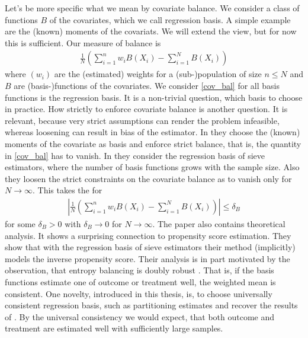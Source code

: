 Let's be more specific what we mean by covariate balance.
We consider a class of functions $B$ of the covariates, which we call regression basis.
A simple example are the (known) moments of the covariats.
We will extend the view, but for now this is sufficient.
Our measure of balance is
\begin{gather}
  \label{cov_bal}
  \frac{1}{N}
  \left( 
    \sum_{i=1}^{n}
    w_i
    B(X_i)
    -
    \sum_{i=1}^{N} 
    B(X_i)
  \right)
\end{gather}
where $(w_i)$ are the (estimated) weights for a (sub-)population of size $n\le N$ and $B$ are (basis-)functions of the covariates.
We consider \eqref{cov_bal} for all basis functions is the regression basis.
It is a non-trivial question, which basis to choose in practice.
How strictly to enforce covariate balance is another question.
It is relevant, because very strict assumptions can render the problem infeasible, whereas loosening can result in bias of the estimator.
In \cite{Hainmueller2012} they choose the (known) moments of the covariate as basis and enforce strict balance, that is, the quantity in \eqref{cov_bal} has to vanish.
In \cite{Wang2019} they consider the regression basis of sieve estimators\cite{Newey1997a}, where the number of basis functions grows with the sample size.
Also they loosen the strict constraints on the covariate balance as to vanish only for $N\to\infty$. This takes the for
\begin{gather}
  \left| 
  \label{cov_bal}
  \frac{1}{N}
  \left( 
    \sum_{i=1}^{n}
    w_i
    B(X_i)
    -
    \sum_{i=1}^{N} 
    B(X_i)
  \right)
  \right|
  \le \delta_B
\end{gather}
for some $\delta_B > 0 $ with $\delta_B\to 0$ for $N\to\infty$.
The paper \cite{Wang2019} also contains theoretical analysis.
It shows a surprising connection to propensity score estimation.
They show that with the regression basis of sieve estimators their method (implicitly) models the inverse propensity score.
Their analysis is in part motivated by the observation, that entropy balancing is doubly robust \cite{Zhao2017a}.
That is, if the basis functions estimate one of outcome or treatment well, the weighted mean is consistent.
One novelty, introduced in this thesis, is, to choose universally consistent regression basis, such as partitioning estimates \cite{Gyorfi2002} and recover the results of \cite{Wang2019}.
By the universal consistency we would expect, that both outcome and treatment are estimated well with sufficiently large samples.

